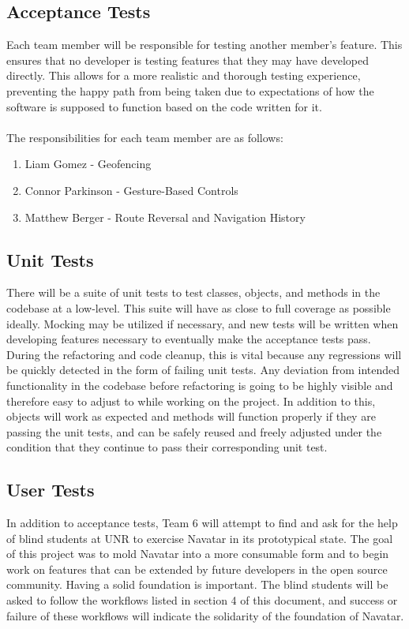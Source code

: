 \documentclass{scrreprt}
\begin{document}
\subsection{Acceptance Tests}
	Each team member will be responsible for testing another member's feature. This ensures that no developer is testing features that they may have developed directly. This allows for a more realistic and thorough testing experience, preventing the happy path from being taken due to expectations of how the software is supposed to function based on the code written for it.\\\\The responsibilities for each team member are as follows:
	\begin{enumerate}
		\item Liam Gomez - Geofencing
		\item Connor Parkinson - Gesture-Based Controls
		\item Matthew Berger - Route Reversal and Navigation History
	\end{enumerate}
	
\pagebreak

\subsection{Unit Tests}

There will be a suite of unit tests to test classes, objects, and methods in the codebase at a low-level. This suite will have as close to full coverage as possible ideally. Mocking may be utilized if necessary, and new tests will be written when developing features necessary to eventually make the acceptance tests pass. During the refactoring and code cleanup, this is vital because any regressions will be quickly detected in the form of failing unit tests. Any deviation from intended functionality in the codebase before refactoring is going to be highly visible and therefore easy to adjust to while working on the project. In addition to this, objects will work as expected and methods will function properly if they are passing the unit tests, and can be safely reused and freely adjusted under the condition that they continue to pass their corresponding unit test.

\subsection{User Tests}

In addition to acceptance tests, Team 6 will attempt to find and ask for the help of blind students at UNR to exercise Navatar in its prototypical state. The goal of this project was to mold Navatar into a more consumable form and to begin work on features that can be extended by future developers in the open source community. Having a solid foundation is important. The blind students will be asked to follow the workflows listed in section 4 of this document, and success or failure of these workflows will indicate the solidarity of the foundation of Navatar.
\end{document}
